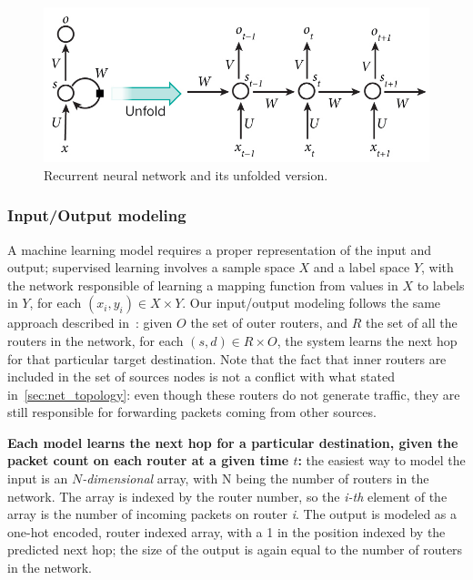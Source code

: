 \begin{figure}[]
\centering
\includegraphics[width=\textwidth]{img/rnn}
\caption{Recurrent neural network and its unfolded version.\protect\footnotemark }
\label{fig:rnn}
\end{figure}

\subsubsection{Input/Output modeling}
A machine learning model requires a proper representation of the input and output; supervised learning involves a sample space $X$ and a label space $Y$, with the network responsible of learning a mapping function from values in $X$ to labels in $Y$, for each $(x_i, y_i) \in X\times Y$. Our input/output modeling follows the same approach described in~\cite{Kato}: given $O$ the set of outer routers, and $R$ the set of all the routers in the network, for each $(s, d) \in R \times O$, the system learns the next hop for that particular target destination. Note that the fact that inner routers are included in the set of sources nodes is not a conflict with what stated in~\ref{sec:net_topology}: even though these routers do not generate traffic, they are still responsible for forwarding packets coming from other sources.

{\bf Each model learns the next hop for a particular destination, given the packet count on each router at a given time $t$: } the easiest way to model the input is an $N$\textit{-dimensional} array, with N being the number of routers in the network. The array is indexed by the router number, so the \textit{i-th} element of the array is the number of incoming packets on router \textit{i}. The output is modeled as a one-hot encoded, router indexed array, with a 1 in the position indexed by the predicted next hop; the size of the output is again equal to the number of routers in the network.

